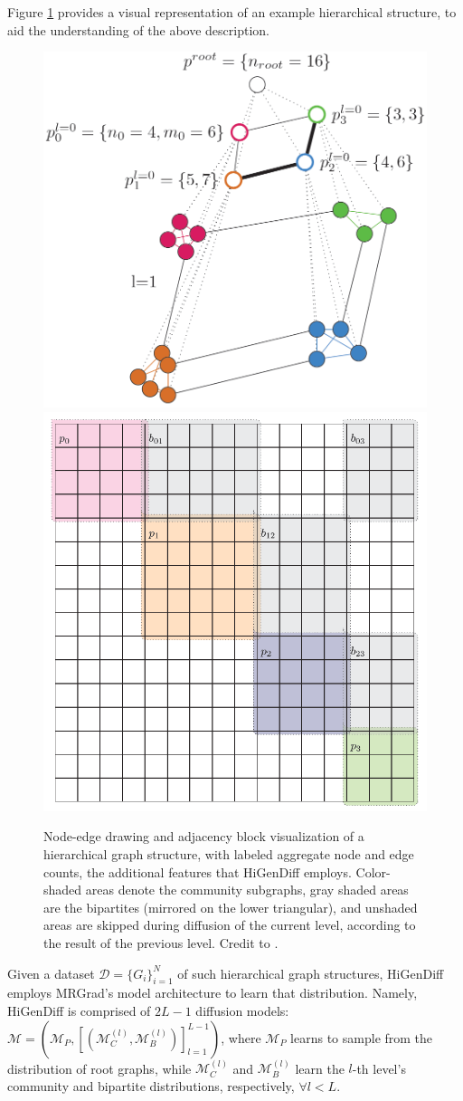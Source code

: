 Figure \ref{fig:higendiff} provides a visual representation of an example hierarchical structure, to aid the understanding of the above description.
\begin{figure}[H]
    \centering
    \includegraphics[width=0.35\linewidth]{figures/higendiff/hierarchical_graph.png}
    \includegraphics[width=0.35\linewidth]{figures/higendiff/hierarchical_adj.png}
    \caption[Node-edge drawing and adjacency block visualization of a hierarchical graph structure.]{Node-edge drawing and adjacency block visualization of a hierarchical graph structure, with labeled aggregate node and edge counts, the additional features that HiGenDiff employs. Color-shaded areas denote the community subgraphs, gray shaded areas are the bipartites (mirrored on the lower triangular), and unshaded areas are skipped during diffusion of the current level, according to the result of the previous level. Credit to \cite{karami_multi-resolution_2024}.}
    \label{fig:higendiff}
\end{figure}
Given a dataset $\mathcal{D}=\{G_i\}_{i=1}^{N}$ of such hierarchical graph structures, HiGenDiff employs MRGrad's model architecture \cite{karami_multi-resolution_2024} to learn that distribution. Namely, HiGenDiff is comprised of $2L-1$ diffusion models: $\mathcal{M}=(\mathcal{M}_P,[(\mathcal{M}^{(l)}_C,\mathcal{M}^{(l)}_B)]_{l=1}^{L-1})$, where $\mathcal{M}_P$ learns to sample from the distribution of root graphs, while $\mathcal{M}^{(l)}_C$ and $\mathcal{M}^{(l)}_B$ learn the $l$-th level's community and bipartite distributions, respectively, $\forall l<L$. 

